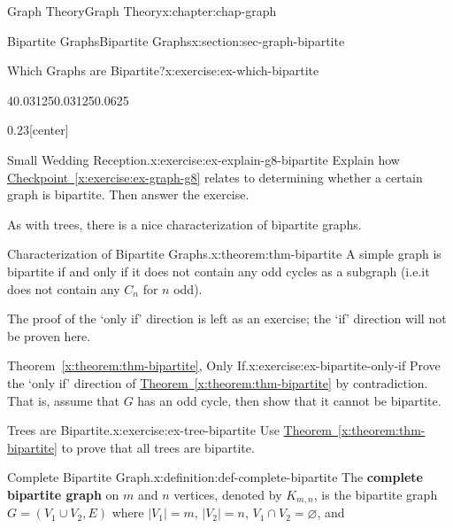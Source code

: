 \documentclass[oneside,10pt,]{book}
\newcommand{\xreffont}{\relax}
\newcommand{\terminology}[1]{\textbf{#1}}
\numberwithin{equation}{section}
\begin{document}
\begin{chapterptx}{Graph Theory}{}{Graph Theory}{}{}{x:chapter:chap-graph}
\begin{sectionptx}{Bipartite Graphs}{}{Bipartite Graphs}{}{}{x:section:sec-graph-bipartite}
\begin{inlineexercise}{Which Graphs are Bipartite?}{x:exercise:ex-which-bipartite}
\begin{sidebyside}{4}{0.03125}{0.03125}{0.0625}
\begin{sbspanel}{0.23}[center]
{
}%
\end{sbspanel}%
\end{sidebyside}%
\end{inlineexercise}%
\begin{inlineexercise}{Small Wedding Reception.}{x:exercise:ex-explain-g8-bipartite}%
Explain how \hyperref[x:exercise:ex-graph-g8]{Checkpoint~{\xreffont\ref{x:exercise:ex-graph-g8}}} relates to determining whether a certain graph is bipartite. Then answer the exercise.%
\end{inlineexercise}%
As with trees, there is a nice characterization of bipartite graphs.%
\begin{theorem}{Characterization of Bipartite Graphs.}{}{x:theorem:thm-bipartite}%
A simple graph is bipartite if and only if it does not contain any odd cycles as a subgraph (i.e.\@ it does not contain any \(C_n\) for \(n\) odd).%
\end{theorem}
The proof of the `only if' direction is left as an exercise; the `if' direction will not be proven here.%
\begin{inlineexercise}{Theorem~{\xreffont\ref*{x:theorem:thm-bipartite}}, Only If.}{x:exercise:ex-bipartite-only-if}%
Prove the `only if' direction of \hyperref[x:theorem:thm-bipartite]{Theorem~{\xreffont\ref{x:theorem:thm-bipartite}}} by contradiction. That is, assume that \(G\) has an odd cycle, then show that it cannot be bipartite.%
\end{inlineexercise}%
\begin{inlineexercise}{Trees are Bipartite.}{x:exercise:ex-tree-bipartite}%
Use \hyperref[x:theorem:thm-bipartite]{Theorem~{\xreffont\ref{x:theorem:thm-bipartite}}} to prove that all trees are bipartite.%
\end{inlineexercise}%
\begin{definition}{Complete Bipartite Graph.}{x:definition:def-complete-bipartite}%
The \terminology{complete bipartite graph} on \(m\) and \(n\) vertices, denoted by \(K_{m,n}\), is the bipartite graph \(G = (V_1 \cup V_2, E)\) where \(|V_1| = m\), \(|V_2| = n\), \(V_1 \cap V_2 = \varnothing\), and%

\end{definition}
\end{sectionptx}
\end{chapterptx}
\end{document}
